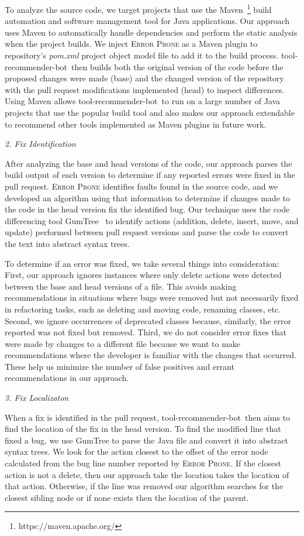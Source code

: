 \documentclass[conference]{IEEEtran}
\newcommand{\tool}{tool-recommender-bot}
\newcommand{\pseudosubsection}[1]{\vspace{2mm} {\it #1}}
\begin{document}
To analyze the source code, we target projects that use the Maven~\footnote{https://maven.apache.org/} build automation and software management tool for Java applications. Our approach uses Maven to automatically handle dependencies and perform the static analysis when the project builds. We inject \textsc{Error Prone} as a Maven plugin to repository's \textit{pom.xml} project object model file to add it to the build process. \tool~then builds both the original version of the code before the proposed changes were made (base) and the changed version of the repository with the pull request modifications implemented (head) to inspect differences. Using Maven allows \tool~to run on a large number of Java projects that use the popular build tool and also makes our approach extendable to recommend other tools implemented as Maven plugins in future work. 

\pseudosubsection{2. Fix Identification}

After analyzing the base and head versions of the code, our approach parses the build output of each version to determine if any reported errors were fixed in the pull request. \textsc{Error Prone} identifies faults found in the source code, and we developed an algorithm using that information to determine if changes made to the code in the head version fix the identified bug. Our technique uses the code differencing tool GumTree~\cite{GumTree} to identify actions (addition, delete, insert, move, and update) performed between pull request versions and parse the code to convert the text into abstract syntax trees. 

To determine if an error was fixed, we take several things into consideration: First, our approach ignores instances where only delete actions were detected between the base and head versions of a file. This avoids making recommendations in situations where bugs were removed but not necessarily fixed in refactoring tasks, such as deleting and moving code, renaming classes, etc. Second, we ignore occurrences of deprecated classes because, similarly, the error reported was not fixed but removed. Third, we do not consider error fixes that were made by changes to a different file because we want to make recommendations where the developer is familiar with the changes that occurred. These help us minimize the number of false positives and errant recommendations in our approach.

\pseudosubsection{3. Fix Localizaton}

When a fix is identified in the pull request, \tool~then aims to find the location of the fix in the head version. To find the modified line that fixed a bug, we use GumTree to parse the Java file and convert it into abstract syntax trees. We look for the action closest to the offset of the error node calculated from the bug line number reported by \textsc{Error Prone}. If the closest action is not a delete, then our approach take the location takes the location of that action. Otherwise, if the line was removed our algorithm searches for the closest sibling node or if none exists then the location of the parent.
\end{document}
